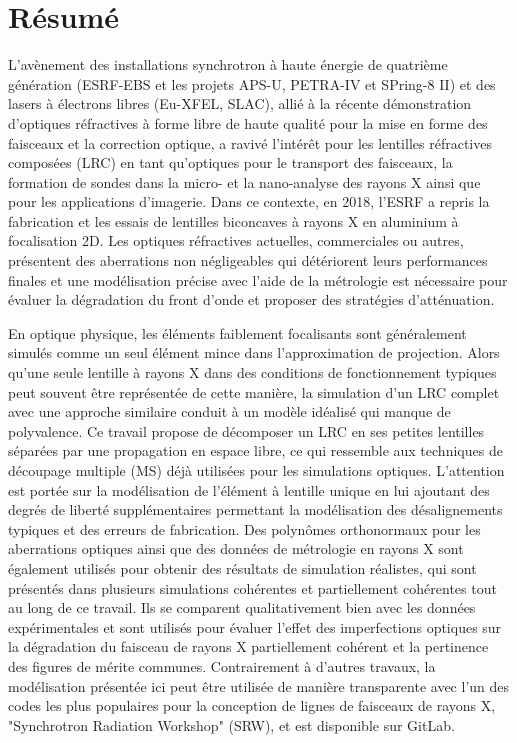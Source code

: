 \chapter*{Résumé}
\label{sec:abstractFR}
\vspace*{-10mm}

L'avènement des installations synchrotron à haute énergie de quatrième génération (ESRF-EBS et les projets APS-U, PETRA-IV et SPring-8 II) et des lasers à électrons libres (Eu-XFEL, SLAC), allié à la récente démonstration d'optiques réfractives à forme libre de haute qualité pour la mise en forme des faisceaux et la correction optique, a ravivé l'intérêt pour les lentilles réfractives composées (LRC) en tant qu'optiques pour le transport des faisceaux, la formation de sondes dans la micro- et la nano-analyse des rayons X ainsi que pour les applications d'imagerie. Dans ce contexte, en 2018, l'ESRF a repris la fabrication et les essais de lentilles biconcaves à rayons X en aluminium à focalisation 2D. Les optiques réfractives actuelles, commerciales ou autres, présentent des aberrations non négligeables qui détériorent leurs performances finales et une modélisation précise avec l'aide de la métrologie est nécessaire pour évaluer la dégradation du front d'onde et proposer des stratégies d'atténuation.

En optique physique, les éléments faiblement focalisants sont généralement simulés comme un seul élément mince dans l'approximation de projection. Alors qu'une seule lentille à rayons X dans des conditions de fonctionnement typiques peut souvent être représentée de cette manière, la simulation d'un LRC complet avec une approche similaire conduit à un modèle idéalisé qui manque de polyvalence. Ce travail propose de décomposer un LRC en ses petites lentilles séparées par une propagation en espace libre, ce qui ressemble aux techniques de découpage multiple (MS) déjà utilisées pour les simulations optiques. L'attention est portée sur la modélisation de l'élément à lentille unique en lui ajoutant des degrés de liberté supplémentaires permettant la modélisation des désalignements typiques et des erreurs de fabrication. Des polynômes orthonormaux pour les aberrations optiques ainsi que des données de métrologie en rayons X sont également utilisés pour obtenir des résultats de simulation réalistes, qui sont présentés dans plusieurs simulations cohérentes et partiellement cohérentes tout au long de ce travail. Ils se comparent qualitativement bien avec les données expérimentales et sont utilisés pour évaluer l'effet des imperfections optiques sur la dégradation du faisceau de rayons X partiellement cohérent et la pertinence des figures de mérite communes. Contrairement à d'autres travaux, la modélisation présentée ici peut être utilisée de manière transparente avec l'un des codes les plus populaires pour la conception de lignes de faisceaux de rayons X, "Synchrotron Radiation Workshop" (SRW), et est disponible sur GitLab.

